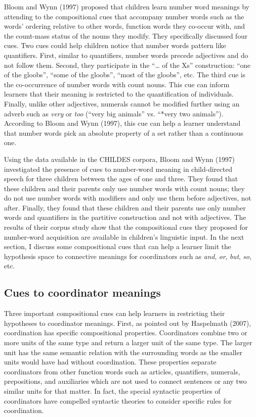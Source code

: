 \documentclass[floatsintext,man]{apa6}
\theoremstyle{definition}
\theoremstyle{definition}
\theoremstyle{definition}
\theoremstyle{remark}
\begin{document}
Bloom and Wynn (1997) proposed that children learn number word meanings
by attending to the compositional cues that accompany number words such
as the words' ordering relative to other words, function words they
co-occur with, and the count-mass status of the nouns they modify. They
specifically discussed four cues. Two cues could help children notice
that number words pattern like quantifiers. First, similar to
quantifiers, number words precede adjectives and do not follow them.
Second, they participate in the \enquote{\ldots{} of the Xs}
construction: \enquote{one of the gloobs}, \enquote{some of the gloobs},
\enquote{most of the gloobs}, etc. The third cue is the co-occurrence of
number words with count nouns. This cue can inform learners that their
meaning is restricted to the quantification of individuals. Finally,
unlike other adjectives, numerals cannot be modified further using an
adverb such as \emph{very} or \emph{too} (\enquote{very big animals} vs.
\enquote{*very two animals}). According to Bloom and Wynn (1997), this
cue can help a learner understand that number words pick an absolute
property of a set rather than a continuous one.

Using the data available in the CHILDES corpora, Bloom and Wynn (1997)
investigated the presence of cues to number-word meaning in
child-directed speech for three children between the ages of one and
three. They found that these children and their parents only use number
words with count nouns; they do not use number words with modifiers and
only use them before adjectives, not after. Finally, they found that
these children and their parents use only number words and quantifiers
in the partitive construction and not with adjectives. The results of
their corpus study show that the compositional cues they proposed for
number-word acquisition are available in children's linguistic input. In
the next section, I discuss some compositional cues that can help a
learner limit the hypothesis space to connective meanings for
coordinators such as \emph{and}, \emph{or}, \emph{but}, \emph{so}, etc.

\subsection{Cues to coordinator
meanings}\label{cues-to-coordinator-meanings}

Three important compositional cues can help learners in restricting
their hypotheses to coordinator meanings. First, as pointed out by
Haspelmath (2007), coordination has specific compositional properties.
Coordinators combine two or more units of the same type and return a
larger unit of the same type. The larger unit has the same semantic
relation with the surrounding words as the smaller units would have had
without coordination. These properties separate coordinators from other
function words such as articles, quantifiers, numerals, prepositions,
and auxiliaries which are not used to connect sentences or any two
similar units for that matter. In fact, the special syntactic properties
of coordinators have compelled syntactic theories to consider specific
rules for coordination.
\end{document}

